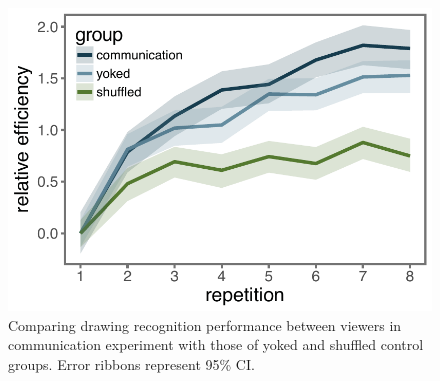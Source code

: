 \documentclass[11pt,letterpaper]{article}
\begin{document}
\begin{figure}[t!]
\begin{center}
\includegraphics[width=0.5 \linewidth]{figures/recog_BIS_timeseries.pdf}
\caption{Comparing drawing recognition performance between viewers in communication experiment with those of yoked and shuffled control groups. Error ribbons represent 95\% CI.}
\label{recog_bis}
\end{center}
\end{figure}



\end{document}

